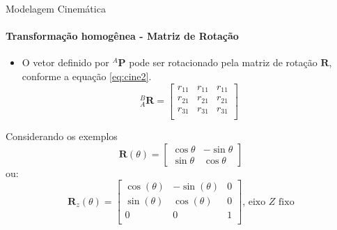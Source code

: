 \documentclass[aspectratio=169]{beamer}
\begin{document}
\begin{frame}{Modelagem Cinemática}
    \framesubtitle{Transformação homogênea - Matriz de Rotação}
    \begin{itemize}
        \item O vetor definido por ${}^A\mathbf{P}$ pode ser rotacionado pela matriz de rotação $\mathbf{R}$, conforme a equação \eqref{eq:cine2}.
              \begin{equation}\label{eq:cine2}
                  {}_A^B
                  \mathbf{R} =
                  \begin{bmatrix}
                      r_{11} & r_{11} & r_{11} \\
                      r_{21} & r_{21} & r_{21} \\
                      r_{31} & r_{31} & r_{31} \\
                  \end{bmatrix}
              \end{equation}
    \end{itemize}

    \begin{block}{Considerando os exemplos}
        \begin{equation*}
            \mathbf{R}(\theta) =
            \begin{bmatrix}
                \cos \theta & -\sin \theta \\\sin \theta &\cos \theta
            \end{bmatrix}
        \end{equation*}
        ou:
        \begin{equation*}
            \mathbf{R}_z(\theta) =
            \begin{bmatrix}
                \cos(\theta) & -\sin(\theta) & 0 \\
                \sin(\theta) & \cos(\theta) & 0 \\
                0            & 0            & 1 \\
            \end{bmatrix} \text{, eixo $Z$ fixo}
        \end{equation*}
    \end{block}

\end{frame}
\end{document}
